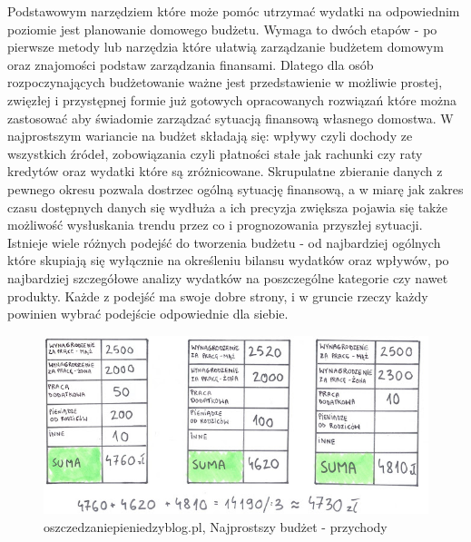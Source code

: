 \documentclass[a4paper,10pt, twoside]{report}
\begin{document}
{Podstawowym narzędziem które może pomóc utrzymać wydatki na odpowiednim 
poziomie jest planowanie domowego budżetu. Wymaga to dwóch etapów - po pierwsze 
metody lub narzędzia które ułatwią zarządzanie budżetem domowym oraz znajomości 
podstaw zarządzania finansami. Dlatego dla osób rozpoczynających budżetowanie 
ważne jest przedstawienie w możliwie prostej, zwięzłej i przystępnej formie już 
gotowych opracowanych rozwiązań które można zastosować aby świadomie zarządzać 
sytuacją finansową własnego domostwa. W najprostszym wariancie na 
budżet\cite{o24_budzetowanie}\cite{budget}\cite{mintbudget} składają się: 
wpływy czyli dochody ze wszystkich źródeł, zobowiązania czyli płatności stałe 
jak rachunki czy raty kredytów oraz wydatki które są zróżnicowane. Skrupulatne 
zbieranie danych z pewnego okresu pozwala dostrzec ogólną sytuację finansową, a 
w miarę jak zakres czasu dostępnych danych się wydłuża a ich precyzja zwiększa 
pojawia się także możliwość wysłuskania trendu przez co i prognozowania 
przyszłej sytuacji. Istnieje wiele różnych podejść do tworzenia budżetu - od 
najbardziej ogólnych które skupiają się wyłącznie na określeniu bilansu wydatków
 oraz wpływów, po najbardziej szczegółowe analizy wydatków na poszczególne 
kategorie czy nawet produkty. Każde z podejść ma swoje dobre strony, i w gruncie
 rzeczy każdy powinien wybrać podejście odpowiednie dla siebie.}

\begin{figure}[H]           %
    \caption{oszczedzaniepieniedzyblog.pl, Najprostszy budżet - przychody}
    \label{fig:}
    \centering  
    \includegraphics[width=12cm]{figures/oszczedzaniepieniedzyblog-pl_przychody.jpg}
\end{figure}
\end{document}

